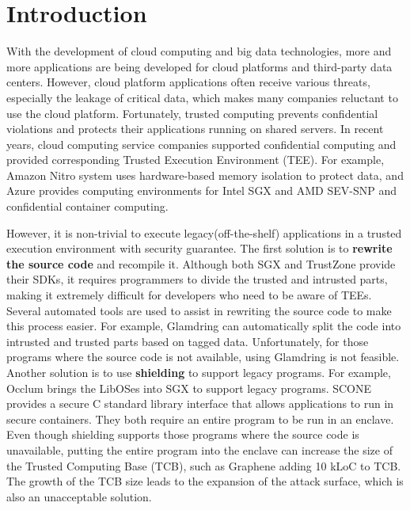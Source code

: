 \section{Introduction}
With the development of cloud computing and big data technologies,
more and more applications are being developed for cloud platforms
and third-party data centers. However, cloud platform applications
often receive various threats, especially the leakage of critical data,
which makes many companies reluctant to use the cloud platform.
Fortunately, trusted computing prevents confidential violations and
protects their applications running on shared servers.
In recent years, cloud computing service companies supported confidential
computing and provided corresponding Trusted Execution Environment (TEE).
For example, Amazon Nitro system \cite{AmazonNitro} uses hardware-based memory
isolation to protect data, and Azure \cite{AzureDocs} provides computing environments
for Intel SGX and AMD SEV-SNP and confidential container computing.

However, it is non-trivial to execute legacy(off-the-shelf) applications
in a trusted execution environment with security guarantee.
The first solution is to \textbf{rewrite the source code} and recompile it.
Although both SGX and TrustZone provide their SDKs, it requires programmers
to divide the trusted and intrusted parts, making it extremely difficult for
developers who need to be aware of TEEs. Several automated tools are used to assist
in rewriting the source code to make this process easier.
For example, Glamdring \cite{Lind2017GlamdringAA} can automatically
split the code into intrusted and trusted parts based on tagged data.
Unfortunately, for those programs where the source code is not available,
using Glamdring is not feasible.
Another solution is to use \textbf{shielding} to support legacy programs.
For example, Occlum \cite{Shen2020OcclumSA} brings the LibOSes
into SGX to support legacy programs. SCONE \cite{Arnautov2016SCONESL}
provides a secure C standard library interface that allows applications to
run in secure containers. They both require an entire program to be run in an enclave.
Even though shielding supports those programs where the source code is unavailable,
putting the entire program into the enclave can increase the size of the
Trusted Computing Base (TCB), such as Graphene \cite{Tsai2017GrapheneSGXAP}
adding 10 kLoC to TCB.
The growth of the TCB size leads to the expansion of the attack surface,
which is also an unacceptable solution.

